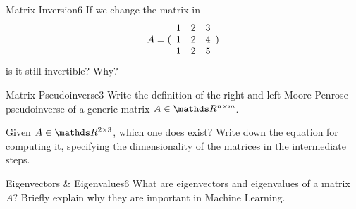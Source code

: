 \begin{questions}
\begin{question}{Matrix Inversion}{6}
If we change the matrix in
\begin{equation*}
     A = ( \begin{array}{c c c} 
     1 & 2 & 3 \\
     1 & 2 & 4 \\
     1 & 2 & 5 \end{array} )
\end{equation*}
is it still invertible? Why?

\begin{answer}\end{answer}

\end{question}
	

\begin{question}{Matrix Pseudoinverse}{3}
	Write the definition of the right and left Moore-Penrose pseudoinverse of a generic matrix $A \in \R^{n\times m}$.
	
	Given $A \in \R^{2 \times 3}$, which one does exist? Write down the equation for computing it, specifying the dimensionality of the matrices in the intermediate steps.
	
\begin{answer}\end{answer}
\end{question}


\begin{question}{Eigenvectors \& Eigenvalues}{6}
What are eigenvectors and eigenvalues of a matrix $A$? Briefly explain why they are important in Machine Learning.

\begin{answer}\end{answer}

\end{question}


\end{questions}
